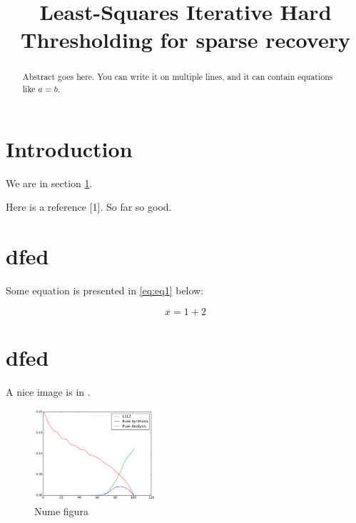 \documentclass[conference,a4paper]{IEEEtran}
\begin{document}
\title{Least-Squares Iterative Hard Thresholding for sparse recovery}


\author{
}

\maketitle

\begin{abstract}
Abstract goes here. You can write it on multiple lines, and it can
contain equations like \(a = b\).
\end{abstract}

\IEEEpeerreviewmaketitle


\hypertarget{sec:intro}{%
\section{Introduction}\label{sec:intro}}

We are in section \cref{sec:intro}.

Here is a reference {[}1{]}. So far so good.

\hypertarget{dfed}{%
\section{dfed}\label{dfed}}

Some equation is presented in \cref{eq:eq1} below:

\begin{equation}x = 1 + 2\label{eq:eq1}\end{equation}

\hypertarget{dfed-1}{%
\section{dfed}\label{dfed-1}}

A nice image is in .

\begin{figure}
\hypertarget{fig:test}{%
\centering
\includegraphics[width=0.4\textwidth,height=\textheight]{Figure.pdf}
\caption{Nume figura}\label{fig:test}
}
\end{figure}
\end{document}
